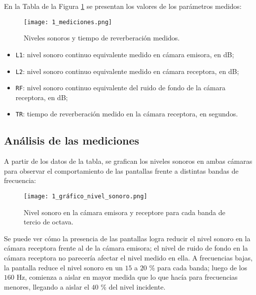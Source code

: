 	En la Tabla de la Figura \ref{1_mediciones} se presentan los valores de los parámetros medidos:
	
		\begin{figure}[H]
			\centering
			\texttt{[image: 1\_mediciones.png]}\\
			\caption{Niveles sonoros y tiempo de reverberación medidos.}
			\label{1_mediciones}
		\end{figure}
	
	\begin{itemize}
		\item \texttt{L1}: nivel sonoro continuo equivalente medido en cámara emisora, en dB;
		\item \texttt{L2}: nivel sonoro continuo equivalente medido en cámara receptora, en dB;
		\item \texttt{RF}: nivel sonoro continuo equivalente del ruido de fondo de la cámara receptora, en dB;
		\item \texttt{TR}: tiempo de reverberación medido en la cámara receptora, en segundos.
	\end{itemize}
	
	\subsection{Análisis de las mediciones}
	
		A partir de los datos de la tabla, se grafican los niveles sonoros en ambas cámaras para observar el comportamiento de las pantallas frente a distintas bandas de frecuencia:
	
		\begin{figure}[H]
			\centering
			\texttt{[image: 1\_gráfico\_nivel\_sonoro.png]}\\
			\caption{Nivel sonoro en la cámara emisora y receptore para cada banda de tercio de octava.}
			\label{1_gráfico_nivel_sonoro}
		\end{figure}
		
		Se puede ver cómo la presencia de las pantallas logra reducir el nivel sonoro en la cámara receptora frente al de la cámara emisora; el nivel de ruido de fondo en la cámara receptora no parecería afectar el nivel medido en ella. A frecuencias bajas, la pantalla reduce el nivel sonoro en un $15$ a $20$ \% para cada banda; luego de los $160$ Hz, comienza a aislar en mayor medida que lo que hacía para frecuencias menores, llegando a aislar el $40$ \% del nivel incidente.\\
	
